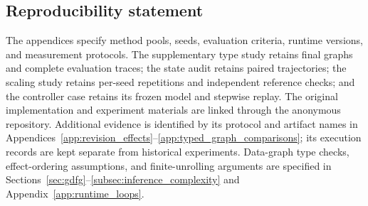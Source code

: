 \subsection*{Reproducibility statement}
The appendices specify method pools, seeds, evaluation criteria, runtime versions, and measurement protocols. The supplementary type study retains final graphs and complete evaluation traces; the state audit retains paired trajectories; the scaling study retains per-seed repetitions and independent reference checks; and the controller case retains its frozen model and stepwise replay. The original implementation and experiment materials are linked through the anonymous repository. Additional evidence is identified by its protocol and artifact names in Appendices~\ref{app:revision_effects}--\ref{app:typed_graph_comparisons}; its execution records are kept separate from historical experiments. Data-graph type checks, effect-ordering assumptions, and finite-unrolling arguments are specified in Sections~\ref{sec:gdfg}--\ref{subsec:inference_complexity} and Appendix~\ref{app:runtime_loops}.
